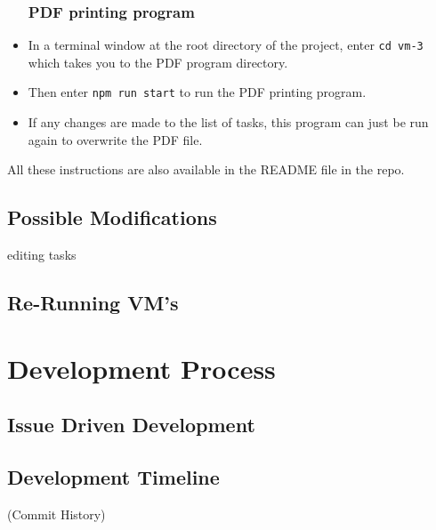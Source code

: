 \documentclass[12pt]{extarticle}
\begin{document}
\begin{itemize}
\subsubsection*{PDF printing program}
\item In a terminal window at the root directory of the project, enter \lstinline|cd vm-3| which takes you to the PDF program directory. 
\item Then enter \lstinline|npm run start| to run the PDF printing program.
\item If any changes are made to the list of tasks, this program can just be run again to overwrite the PDF file.

\end{itemize}

All these instructions are also available in the README file in the repo.

\subsection{Possible Modifications}
editing tasks
\subsection{Re-Running VM's}

\section{Development Process}
\subsection{Issue Driven Development}
\subsection{Development Timeline}
(Commit History)
\end{document}
